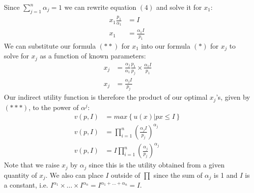 \documentclass{article}
\begin{document}
  Since $\sum_{j=1}^{n} \alpha_{j} = 1$ we can rewrite equation $(4)$ and solve it for $x_{1}$:
  \begin{align*}
    x_{1}\frac{p_{1}}{\alpha_{1}} &= I \\
    x_{1} &= \frac{\alpha_{1}I}{p_{1}} \ \tag{**}
  \end{align*}
  We can substitute our formula $(**)$ for $x_{1}$ into our formula $(*)$ for $x_{j}$ to solve for $x_{j}$ as a function of known parameters:
  \begin{align*}
    x_{j} &= \frac{\alpha_{j}}{\alpha_{1}}\frac{p_{1}}{p_{j}} \times \frac{\alpha_{1}I}{p_{1}} \\
    x_{j} &= \frac{\alpha_{j}I}{p_{j}} \ \tag{***}
  \end{align*}
  Our indirect utility function is therefore the product of our optimal $x_{j}$'s, given by $(***)$, to the power of $\alpha^{j}$:
  \begin{align*}
    v(p,I) &= max \left\{ u(x)|px \leq I \right\} \\
    v(p,I) &= \prod_{i=1}^{n} (\frac{\alpha_{j}I}{p_{j}})^{\alpha_{j}}  \\
    v(p,I) &= I \prod_{i=1}^{n} (\frac{\alpha_{j}}{p_{j}})^{\alpha_{j}} \ \tag{****}
  \end{align*}
  Note that we raise $x_{j}$ by $\alpha_{j}$ since this is the utility obtained from a given quantity of $x_{j}$. We also can place $I$ outside of $\prod$ since the sum of $\alpha_{j}$ is 1 and $I$ is a constant, i.e. $I^{\alpha_{1}} \times \dots \times I^{\alpha_{n}} = I^{\alpha_{1} + \dots + \alpha_{n}} = I$.
  \par
\vspace{6mm}
\end{document}
